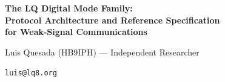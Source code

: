 \documentclass[10pt,twocolumn]{article}
\begin{document}
\begin{strip}
\begin{center}
  \vspace*{-12pt}
  {\LARGE\bfseries\color{paperdark}
    The LQ Digital Mode Family:\\[3pt]
    Protocol Architecture and Reference Specification\\[3pt]
    for Weak-Signal Communications\par}
  \vspace{10pt}
  {\large Luis Quesada (HB9IPH) --- Independent Researcher\par}
  \vspace{3pt}
  {\small\texttt{luis@lq8.org\EndAccSupp{}}\par}
  \vspace{8pt}
\end{center}

\begingroup
  \let\origclearpage\clearpage
  \renewcommand{\clearpage}{\par\vspace{4pt}}
  
\endgroup
\vspace{-6pt}
\end{strip}

%
%
%








\end{document}

